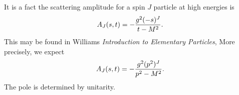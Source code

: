 It is a fact the scattering amplitude for a spin $J$ particle at high
energies is
\begin{equation}
A_{J}(s,t) = -\frac{g^{2}(-s)^{J}}{t-M^{2}}.
\end{equation}
This may be found in Williams \emph{Introduction to Elementary Particles},
More precisely, we expect
\begin{equation}
A_{J}(s,t) = -\frac{g^{2}(p^{2})^{J}}{p^{2}-M^{2}}.
\end{equation}
The pole is determined by unitarity.
